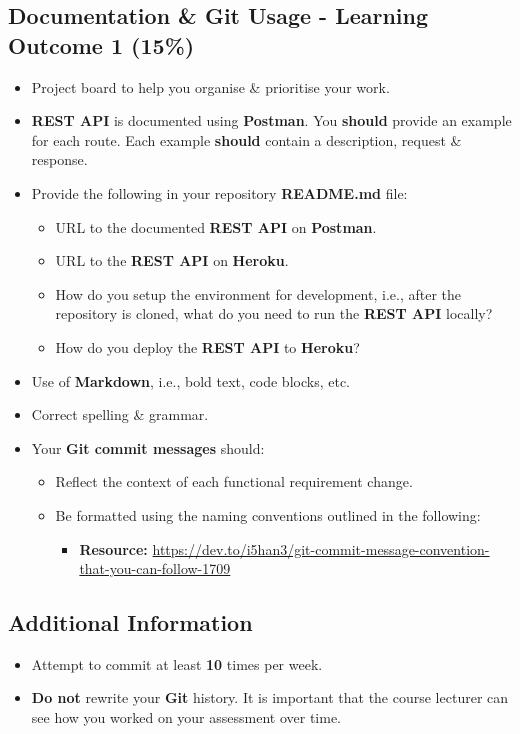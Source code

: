 \documentclass{article}
\begin{document}
\subsection*{Documentation \& Git Usage - Learning Outcome 1 (15\%)}
\begin{itemize}
	\item Project board to help you organise \& prioritise your work. 
	\item \textbf{REST API} is documented using \textbf{Postman}. You \textbf{should} provide an example for each route. Each example \textbf{should} contain a description, request \& response.
	\item Provide the following in your repository \textbf{README.md} file:
	\begin{itemize}
		\item URL to the documented \textbf{REST API} on \textbf{Postman}.
		\item URL to the \textbf{REST API} on \textbf{Heroku}.
		\item How do you setup the environment for development, i.e., after the repository is cloned, what do you need to run the \textbf{REST API} locally?
		\item How do you deploy the \textbf{REST API} to \textbf{Heroku}?
	\end{itemize}
	\item Use of \textbf{Markdown}, i.e., bold text, code blocks, etc.
	\item Correct spelling \& grammar. 
	\item Your \textbf{Git commit messages} should:
	\begin{itemize}
		\item Reflect the context of each functional requirement change.
		\item Be formatted using the naming conventions outlined in the following:
			\begin{itemize}
				\item \textbf{Resource:} \small\href{https://dev.to/i5han3/git-commit-message-convention-that-you-can-follow-1709}{https://dev.to/i5han3/git-commit-message-convention-that-you-can-follow-1709}
			\end{itemize}
	\end{itemize}
\end{itemize}

\subsection*{Additional Information}
\begin{itemize}
    \item Attempt to commit at least \textbf{10} times per week.
    \item \textbf{Do not} rewrite your \textbf{Git} history. It is important that the course lecturer can see how you worked on your assessment over time. 
\end{itemize} 
\end{document}
